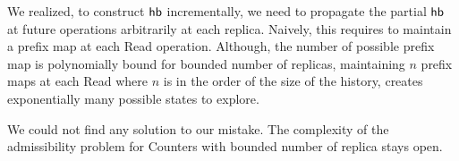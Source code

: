 We realized, to construct $\textsf{hb}$ incrementally, we need to propagate the partial $\textsf{hb}$ at future operations arbitrarily at each replica. Naively, this requires to maintain a prefix map at each \textrm{Read} operation. Although, the number of possible prefix map is polynomially bound for bounded number of replicas, maintaining $n$ prefix maps at each \textrm{Read} where $n$ is in the order of the size of the history, creates exponentially many possible states to explore.

We could not find any solution to our mistake. The complexity of the admissibility problem for Counters with bounded number of replica stays open.